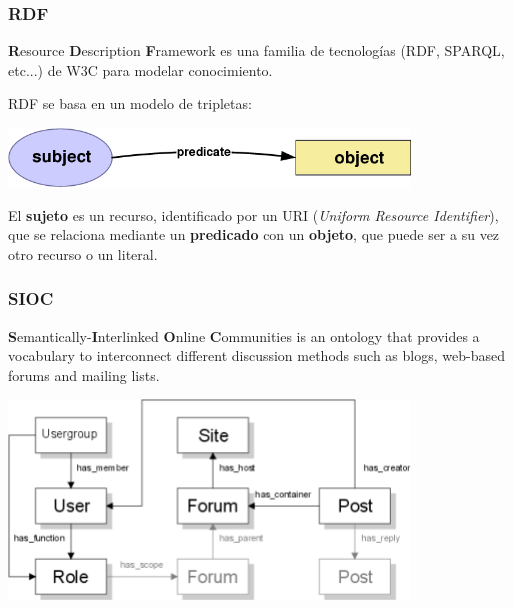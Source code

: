 \documentclass[spanish,notes=hide]{beamer}
\begin{document}
{
  \frametitle{RDF}

  \begin{Large}
     \textbf{R}esource \textbf{D}escription \textbf{F}ramework es una familia de
     tecnologías (RDF, SPARQL, etc...) de W3C para modelar conocimiento. 
  \end{Large}

  \vspace{0.7cm}

  \begin{Large}
     RDF se basa en un modelo de tripletas:
     \begin{center}
       \includegraphics[width=0.8\textwidth]{images/triple.png}
     \end{center}
     El \textbf{sujeto} es un recurso, identificado por un URI 
     (\textit{Uniform Resource Identifier}), que se relaciona mediante un 
     \textbf{predicado} con un \textbf{objeto}, que puede ser a su vez otro 
     recurso o un literal.
  \end{Large}
}
\frame
{
  \frametitle{SIOC}

  \begin{Large}
    \textbf{S}emantically-\textbf{I}nterlinked \textbf{O}nline \textbf{C}ommunities 
    is an ontology that provides a vocabulary to interconnect different discussion 
    methods such as blogs, web-based forums and mailing lists.
  \end{Large}

  \begin{center}
    \includegraphics[width=0.8\textwidth]{images/sioc-terms.png}
  \end{center}

}
\end{document}
